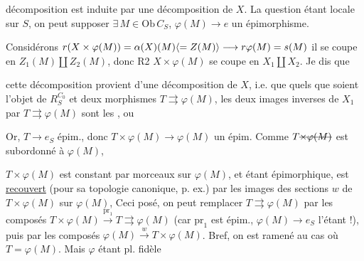 
décomposition est induite par une décomposition de $X$. La question étant locale sur $S$, on peut supposer $\exists\,M\in\mathrm{Ob}\,C_S$, $\varphi(M)\longrightarrow e$ un épimorphisme.

Considérons $r(X\times\varphi(M))=\alpha(X)(M)\inserted{=Z(M)}\longrightarrow r\varphi(M)=s(M)$ il se coupe en $Z_1(M)\amalg Z_2(M)$, donc  R2 $X\times\varphi(M)$ se coupe en $X_1\amalg X_2$. Je dis que


cette décomposition provient d'une décomposition de $X$, i.e. que quels que soient  l'objet  de $R_S^{C_0}$ et deux morphismes $T\rightrightarrows\varphi(M)$, les deux images inverses de $X_1$ par $T\rightrightarrows\varphi(M)$ sont les , ou


Or,    $T\longrightarrow e_S$ épim., donc $T\times\varphi(M)\longrightarrow\varphi(M)$ un épim. Comme $T\deleted{\times\varphi(M)}$ est subordonné à $\varphi(M)$,

$T\times\varphi(M)$ est constant par morceaux sur $\varphi(M)$, et étant épimorphique,  est \uline{recouvert} (pour sa topologie canonique, p. ex.) par les images des sections $w$ de \deleted{\unsure{$\varphi$}} $T\times\varphi(M)$ sur $\varphi(M)$, Ceci posé, on peut remplacer $T\rightrightarrows\varphi(M)$ par les composés $T\times\varphi(M)\xrightarrow{\mathrm{pr}_1}T\rightrightarrows\varphi(M)$ (car $\mathrm{pr}_1$ est épim., $\varphi(M)\longrightarrow e_S$ l'étant !), puis  par les composés $\varphi(M)\xrightarrow{w}T\times\varphi(M)$. Bref, on est ramené au cas où $T=\varphi(M)$. Mais $\varphi$ étant pl. fidèle

